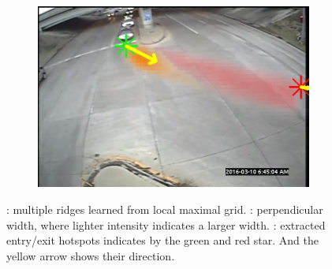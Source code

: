 \begin{figure}
\begin{subfigure}{0.32\linewidth}
        \includegraphics[width=\linewidth]{./img/scene_learning/res/middle/middle-1.jpg}
        \subcaption{}
        \label{subfig:scene-entry-exit}
    \end{subfigure}%
    \caption{: multiple ridges learned from local maximal grid. : perpendicular width, where lighter intensity indicates a larger width. : extracted entry/exit hotspots indicates by the green and red star. And the yellow arrow shows their direction.}
    \label{fig:scene-ridge-res}
\end{figure}